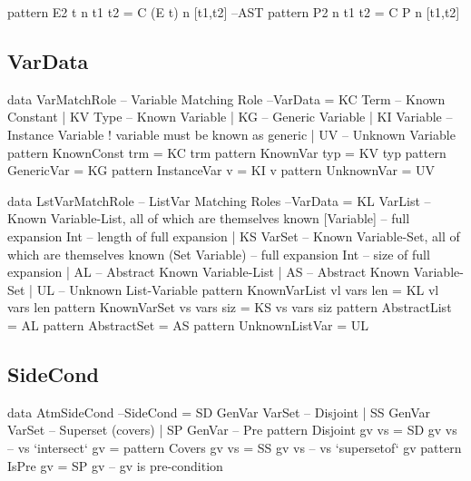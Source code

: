 \begin{code}
pattern E2 t n t1 t2  = C (E t) n [t1,t2]                                --AST
pattern P2   n t1 t2  = C P     n [t1,t2]
\end{code}

\newpage
\subsection{VarData}

\begin{code}
data VarMatchRole -- Variable Matching Role                          --VarData
  =  KC Term     -- Known Constant
  |  KV Type     -- Known Variable
  |  KG          -- Generic Variable
  |  KI Variable -- Instance Variable ! variable must be known as generic
  |  UV          -- Unknown Variable
pattern KnownConst trm = KC trm
pattern KnownVar typ   = KV typ
pattern GenericVar     = KG
pattern InstanceVar v  = KI v
pattern UnknownVar     = UV
\end{code}

\begin{code}
data LstVarMatchRole -- ListVar Matching Roles                       --VarData
 = KL VarList        -- Known Variable-List, all of which are themselves known
      [Variable]     -- full expansion
      Int            -- length of full expansion
 | KS VarSet         -- Known Variable-Set, all of which are themselves known
      (Set Variable) -- full expansion
      Int            -- size of full expansion
 | AL                -- Abstract Known Variable-List
 | AS                -- Abstract Known Variable-Set
 | UL                -- Unknown List-Variable
pattern KnownVarList vl vars len  =  KL vl vars len
pattern KnownVarSet  vs vars siz  =  KS vs vars siz
pattern AbstractList              =  AL
pattern AbstractSet               =  AS
pattern UnknownListVar            =  UL
\end{code}

\subsection{SideCond}

\begin{code}
data AtmSideCond                                                    --SideCond
 = SD  GenVar VarSet -- Disjoint
 | SS  GenVar VarSet -- Superset (covers)
 | SP  GenVar        -- Pre
pattern Disjoint gv vs = SD  gv vs  --  vs `intersect`  gv = {}
pattern Covers   gv vs = SS  gv vs  --  vs `supersetof` gv
pattern IsPre    gv    = SP  gv     --  gv is pre-condition
\end{code}

